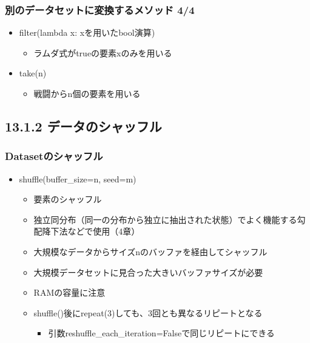 \hypertarget{ux5225ux306eux30c7ux30fcux30bfux30bbux30c3ux30c8ux306bux5909ux63dbux3059ux308bux30e1ux30bdux30c3ux30c9-44}{%
\subsubsection{別のデータセットに変換するメソッド
4/4}\label{ux5225ux306eux30c7ux30fcux30bfux30bbux30c3ux30c8ux306bux5909ux63dbux3059ux308bux30e1ux30bdux30c3ux30c9-44}}

\begin{itemize}
\tightlist
\item
  filter(lambda x: xを用いたbool演算)

  \begin{itemize}
  \tightlist
  \item
    ラムダ式がtrueの要素xのみを用いる
  \end{itemize}
\item
  take(n)

  \begin{itemize}
  \tightlist
  \item
    戦闘からn個の要素を用いる
  \end{itemize}
\end{itemize}

\hypertarget{ux30c7ux30fcux30bfux306eux30b7ux30e3ux30c3ux30d5ux30eb}{%
\subsection{13.1.2
データのシャッフル}\label{ux30c7ux30fcux30bfux306eux30b7ux30e3ux30c3ux30d5ux30eb}}

\hypertarget{datasetux306eux30b7ux30e3ux30c3ux30d5ux30eb}{%
\subsubsection{Datasetのシャッフル}\label{datasetux306eux30b7ux30e3ux30c3ux30d5ux30eb}}

\begin{itemize}
\tightlist
\item
  shuffle(buffer\_size=n, seed=m)

  \begin{itemize}
  \tightlist
  \item
    要素のシャッフル
  \item
    独立同分布（同一の分布から独立に抽出された状態）でよく機能する勾配降下法などで使用（4章）
  \item
    大規模なデータからサイズnのバッファを経由してシャッフル
  \item
    大規模データセットに見合った大きいバッファサイズが必要
  \item
    RAMの容量に注意
  \item
    shuffle()後にrepeat(3)しても、3回とも異なるリピートとなる

    \begin{itemize}
    \tightlist
    \item
      引数reshuffle\_each\_iteration=Falseで同じリピートにできる
    \end{itemize}
  \end{itemize}
\end{itemize}

